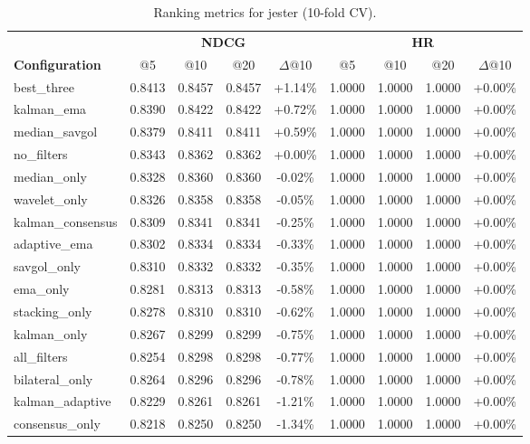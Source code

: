 \begin{table}[htbp]
\centering
\caption{Ranking metrics for jester (10-fold CV).}
\label{tab:ranking-jester}
\begin{adjustbox}{max width=\textwidth}
\begin{tabular}{l cccc cccc}
\toprule
& \multicolumn{4}{c}{\textbf{NDCG}} & \multicolumn{4}{c}{\textbf{HR}} \\
\cmidrule(lr){2-5} \cmidrule(lr){6-9}
\textbf{Configuration} & @5 & @10 & @20 & $\Delta$@10 & @5 & @10 & @20 & $\Delta$@10 \\
\midrule
best\_three & 0.8413 & 0.8457 & 0.8457 & +1.14\% & 1.0000 & 1.0000 & 1.0000 & +0.00\% \\
kalman\_ema & 0.8390 & 0.8422 & 0.8422 & +0.72\% & 1.0000 & 1.0000 & 1.0000 & +0.00\% \\
median\_savgol & 0.8379 & 0.8411 & 0.8411 & +0.59\% & 1.0000 & 1.0000 & 1.0000 & +0.00\% \\
no\_filters & 0.8343 & 0.8362 & 0.8362 & +0.00\% & 1.0000 & 1.0000 & 1.0000 & +0.00\% \\
median\_only & 0.8328 & 0.8360 & 0.8360 & -0.02\% & 1.0000 & 1.0000 & 1.0000 & +0.00\% \\
wavelet\_only & 0.8326 & 0.8358 & 0.8358 & -0.05\% & 1.0000 & 1.0000 & 1.0000 & +0.00\% \\
kalman\_consensus & 0.8309 & 0.8341 & 0.8341 & -0.25\% & 1.0000 & 1.0000 & 1.0000 & +0.00\% \\
adaptive\_ema & 0.8302 & 0.8334 & 0.8334 & -0.33\% & 1.0000 & 1.0000 & 1.0000 & +0.00\% \\
savgol\_only & 0.8310 & 0.8332 & 0.8332 & -0.35\% & 1.0000 & 1.0000 & 1.0000 & +0.00\% \\
ema\_only & 0.8281 & 0.8313 & 0.8313 & -0.58\% & 1.0000 & 1.0000 & 1.0000 & +0.00\% \\
stacking\_only & 0.8278 & 0.8310 & 0.8310 & -0.62\% & 1.0000 & 1.0000 & 1.0000 & +0.00\% \\
kalman\_only & 0.8267 & 0.8299 & 0.8299 & -0.75\% & 1.0000 & 1.0000 & 1.0000 & +0.00\% \\
all\_filters & 0.8254 & 0.8298 & 0.8298 & -0.77\% & 1.0000 & 1.0000 & 1.0000 & +0.00\% \\
bilateral\_only & 0.8264 & 0.8296 & 0.8296 & -0.78\% & 1.0000 & 1.0000 & 1.0000 & +0.00\% \\
kalman\_adaptive & 0.8229 & 0.8261 & 0.8261 & -1.21\% & 1.0000 & 1.0000 & 1.0000 & +0.00\% \\
consensus\_only & 0.8218 & 0.8250 & 0.8250 & -1.34\% & 1.0000 & 1.0000 & 1.0000 & +0.00\% \\

\end{tabular}
\end{adjustbox}
\end{table}
